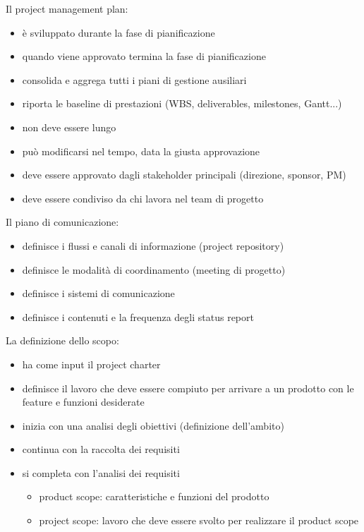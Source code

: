 \documentclass[answers, a4paper, 11pt]{exam}
\begin{document}
Il project management plan:

\begin{itemize}
    \item è sviluppato durante la fase di pianificazione
    \item quando viene approvato termina la fase di pianificazione
    \item consolida e aggrega tutti i piani di gestione ausiliari
    \item riporta le baseline di prestazioni (WBS, deliverables, milestones, Gantt...)
    \item non deve essere lungo
    \item può modificarsi nel tempo, data la giusta approvazione
    \item deve essere approvato dagli stakeholder principali (direzione, sponsor, PM)
    \item deve essere condiviso da chi lavora nel team di progetto
\end{itemize}

Il piano di comunicazione:
\begin{itemize}
    \item definisce i flussi e canali di informazione (project repository)
    \item definisce le modalità di coordinamento (meeting di progetto)
    \item definisce i sistemi di comunicazione
    \item definisce i contenuti e la frequenza degli status report
\end{itemize}

La definizione dello scopo:

\begin{itemize}
    \item ha come input il project charter
    \item definisce il lavoro che deve essere compiuto per arrivare a un prodotto con le feature e funzioni desiderate
    \item inizia con una analisi degli obiettivi (definizione dell'ambito)
    \item continua con la raccolta dei requisiti
    \item si completa con l'analisi dei requisiti
    \begin{itemize}
        \item product scope: caratteristiche e funzioni del prodotto
        \item project scope: lavoro che deve essere svolto per realizzare il product scope
    \end{itemize}
\end{itemize}
\end{document}
